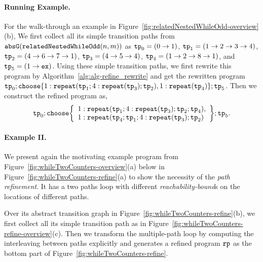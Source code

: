 \paragraph{Running Example.}
For the walk-through an example in Figure~\ref{fig:relatedNestedWhileOdd-overview}(b),
We first collect all its simple transition paths from $\mathtt{abs}{\mathtt{G}}(\mathtt{relatedNestedWhileOdd}(n, m))$ as
$\mathtt{tp}_0 = (0 \to 1)$,
$\mathtt{tp}_1 = (1 \to 2 \to 3 \to 4)$,
$\mathtt{tp}_2 = (4 \to 6 \to 7 \to 1)$,
$\mathtt{tp}_3 = (4 \to 5 \to 4)$, $\mathtt{tp}_4 = (1 \to 2 \to 8 \to 1)$, and $\mathtt{tp}_5 = (1 \to \mathtt{ex})$.
Using these simple transition paths, we first rewrite this program by Algorithm~\ref{alg:alg-refine_rewrite} and get the rewritten program
$ \tpath_0 ; \rpchoose{ 1: \rprepeat(\tpath_1; 4:\rprepeat(\tpath_3); \tpath_2), 
1: \rprepeat(\tpath_4) }; \tpath_5$.
Then we construct the refined program as,
\[
 \tpath_0 ; \rpchoose{ 
 \begin{array}{l}
 1: \rprepeat(\tpath_1; 4:\rprepeat(\tpath_3); \tpath_2; \tpath_4), \\
 1: \rprepeat(\tpath_4; \tpath_1; 4:\rprepeat(\tpath_3); \tpath_2) 
 \end{array}
 }; \tpath_5.
\]

\paragraph{Example II.}
We present again the motivating example program from Figure~\ref{fig:whileTwoCounters-overview}(a)
below in Figure~\ref{fig:whileTwoCounters-refine}(a)
to show the necessity of the \emph{path refinement}. 
It has a two paths loop
with different \emph{reachability-bound}s on the locations of different paths.
%
%

%
Over its abstract transition graph in Figure~\ref{fig:whileTwoCounters-refine}(b), we first collect all its simple transition path as in Figure~\ref{fig:whileTwoCounters-refine-overview}(c).
Then we transform the multiple-path loop by computing the interleaving between paths explicitly and
generates a refined program $\mathtt{rp}$ as the bottom part of Figure~\ref{fig:whileTwoCounters-refine}.

